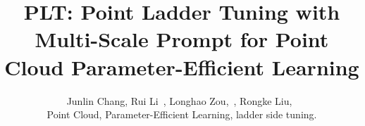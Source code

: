 \documentclass[lettersize,journal]{IEEEtran}
\begin{document}
\title{PLT: Point Ladder Tuning with Multi-Scale Prompt for Point Cloud
Parameter-Efficient Learning}

\author{Junlin Chang, Rui Li~, Longhao Zou,~, Rongke Liu,~




\maketitle



\begin{IEEEkeywords}
Point Cloud, Parameter-Efficient Learning, ladder side tuning.
\end{IEEEkeywords}














}
\end{document}
